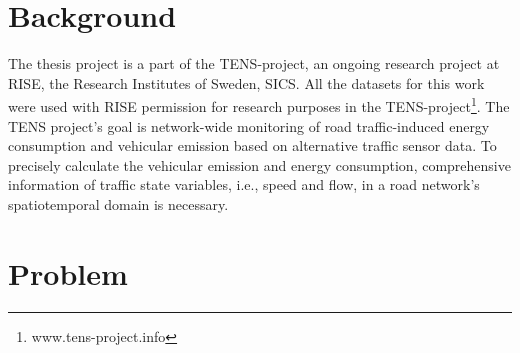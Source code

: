 \documentclass[english]{kththesis}
\begin{document}
\section{Background}
\label{sec:background}
\renewcommand{\thefootnote}{\arabic{footnote}}
The thesis project is a part of the TENS-project, an ongoing research project at RISE, the Research Institutes of Sweden, SICS. All the datasets for this work were used with RISE permission for research purposes in the TENS-project\footnote{www.tens-project.info}. The TENS project's goal is network-wide monitoring of road traffic-induced energy consumption and vehicular emission based on alternative traffic sensor data. To precisely calculate the vehicular emission and energy consumption, comprehensive information of traffic state variables, i.e., speed and flow, in a road network's spatiotemporal domain is necessary.

\section{Problem}
\end{document}
